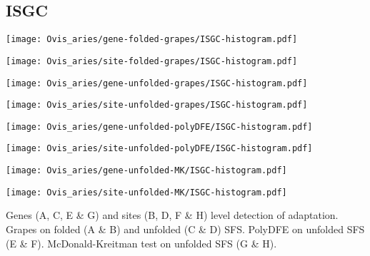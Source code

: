 \documentclass{article}
\begin{document}
\pagebreak
\subsection{ISGC}
\centering
\begin{minipage}{0.49\linewidth}
    \texttt{[image: Ovis\_aries/gene-folded-grapes/ISGC-histogram.pdf]}
\end{minipage}%
\hfill
\begin{minipage}{0.49\linewidth}
    \texttt{[image: Ovis\_aries/site-folded-grapes/ISGC-histogram.pdf]}
\end{minipage}
\hfill
\begin{minipage}{0.49\linewidth}
    \texttt{[image: Ovis\_aries/gene-unfolded-grapes/ISGC-histogram.pdf]}
\end{minipage}%
\hfill
\begin{minipage}{0.49\linewidth}
    \texttt{[image: Ovis\_aries/site-unfolded-grapes/ISGC-histogram.pdf]}
\end{minipage}
\hfill
\begin{minipage}{0.49\linewidth}
    \texttt{[image: Ovis\_aries/gene-unfolded-polyDFE/ISGC-histogram.pdf]}
\end{minipage}%
\hfill
\begin{minipage}{0.49\linewidth}
    \texttt{[image: Ovis\_aries/site-unfolded-polyDFE/ISGC-histogram.pdf]}
\end{minipage}
\hfill
\begin{minipage}{0.49\linewidth}
    \texttt{[image: Ovis\_aries/gene-unfolded-MK/ISGC-histogram.pdf]}
\end{minipage}%
\hfill
\begin{minipage}{0.49\linewidth}
    \texttt{[image: Ovis\_aries/site-unfolded-MK/ISGC-histogram.pdf]}
\end{minipage}
\hfill
\flushleft
Genes (A, C, E \& G) and sites (B, D, F \& H) level detection of adaptation.
Grapes on folded (A \& B) and unfolded (C \& D) SFS.
PolyDFE on unfolded SFS (E \& F).
McDonald-Kreitman test on unfolded SFS (G \& H).
\end{document}
